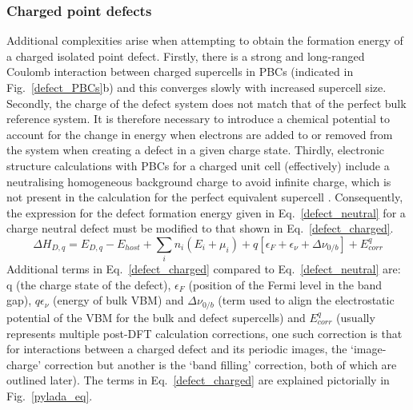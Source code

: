 \documentclass[11pt, twoside]{report}
\begin{document}
\subsubsection{Charged point defects}
Additional complexities arise when attempting to obtain the formation energy of a charged isolated point defect. Firstly, there is a strong and long-ranged Coulomb interaction between charged supercells in PBCs (indicated in Fig.~\ref{defect_PBCs}b) and this converges slowly with increased supercell size.
Secondly, the charge of the defect system does not match that of the perfect bulk reference system. It is therefore necessary to introduce a chemical potential to account for the change in energy when electrons are added to or removed from the system when creating a defect in a given charge state.
Thirdly, electronic structure calculations with PBCs for a charged unit cell (effectively) include a neutralising homogeneous background charge to avoid infinite charge, which is not present in the calculation for the perfect equivalent supercell \cite{freysoldt_rev}. Consequently, the expression for the defect formation energy given in Eq.~\ref{defect_neutral} for a charge neutral defect must be modified to that shown in Eq.~\ref{defect_charged}.
\begin{equation}\label{defect_charged}
\Delta H_{D,q} = E_{D,q} - E_{host} + \sum_i n_i (E_i + \mu_i) + q[\epsilon_F + \epsilon_{\nu} + \Delta \nu_{0/b}] + E^q_{corr}
\end{equation}
Additional terms in Eq.~\ref{defect_charged} compared to Eq.~\ref{defect_neutral} are: q (the charge state of the defect), $\epsilon_F$ (position of the Fermi level in the band gap),  $q \epsilon_{\nu}$ (energy of bulk VBM) and $\Delta \nu_{0/b}$ (term used to align the electrostatic potential of the VBM for the bulk and defect supercells) and $E^q_{corr}$ (usually represents multiple post-DFT calculation corrections, one such correction is that for interactions between a charged defect and its periodic images, the `image-charge' correction but another is the `band filling' correction, both of which are outlined later). 
The terms in Eq.~\ref{defect_charged} are explained pictorially in Fig.~\ref{pylada_eq}.
\end{document}

